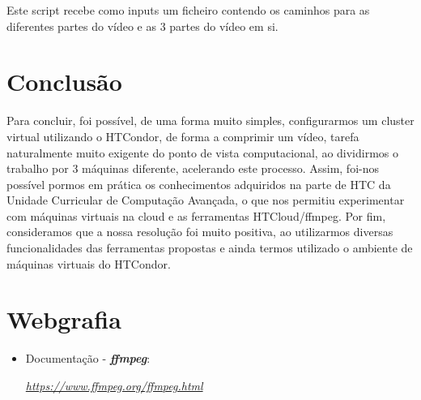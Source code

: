 \documentclass[a4paper]{report}
\begin{document}
	\large{
		Este script recebe como inputs um ficheiro contendo os caminhos para as diferentes partes do vídeo e as 3 partes do vídeo em si.
	}

\chapter{Conclusão}
\large{
	Para concluir, foi possível, de uma forma muito simples, configurarmos um cluster virtual utilizando o HTCondor, de forma a comprimir um vídeo, tarefa naturalmente muito exigente do ponto de vista computacional, ao dividirmos o trabalho por 3 máquinas diferente, acelerando este processo.
	Assim, foi-nos possível pormos em prática os conhecimentos adquiridos na parte de HTC da Unidade Curricular de Computação Avançada, o que nos permitiu experimentar com máquinas virtuais na cloud e as ferramentas HTCloud/ffmpeg.
	Por fim, consideramos que a nossa resolução foi muito positiva, ao utilizarmos diversas funcionalidades das ferramentas propostas e ainda termos utilizado o ambiente de máquinas virtuais do HTCondor.
}

\chapter{Webgrafia}
    \begin{itemize}
        \item Documentação - \textbf{\textit{ffmpeg}}:
        \par \textit{\url{https://www.ffmpeg.org/ffmpeg.html}}
    \end{itemize}
\end{document}
